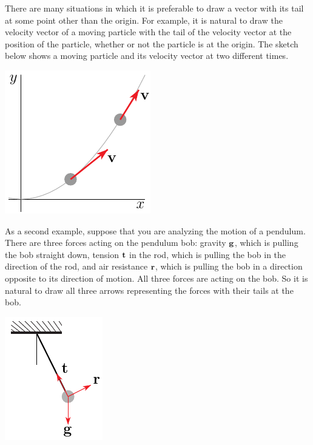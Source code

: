 There are many situations in which it is preferable to draw a vector 
with its tail at some point other than the origin. For example, it is 
natural to draw the velocity vector of a moving particle with the tail
of the velocity vector at the position of the particle, whether or not
the particle is at the origin. The sketch below shows a moving particle
and its velocity vector at two different times.
      \begin{efig} 
      \begin{center}
      \includegraphics{movingParticle.pdf}
      \end{center}
      \end{efig}
As a second example, suppose that you are analyzing the motion of a pendulum.
There are three forces acting on the pendulum bob: gravity $\mathbf{g}$, which
is pulling the bob straight down, tension $\mathbf{t}$ in the rod, which is
pulling the bob in the direction of the rod, and air resistance $\mathbf{r}$, 
which is pulling the bob in a direction opposite to its direction of motion.
All three forces are acting on the bob. So it is natural to draw all three
arrows representing the forces with their tails at the bob. 
      \begin{efig} 
      \begin{center}
      \includegraphics{pendulum.pdf}
      \end{center}
      \end{efig}

